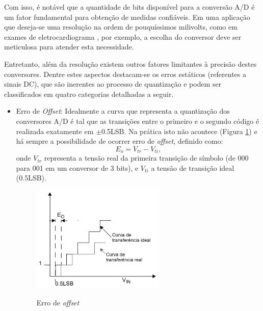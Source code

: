 \documentclass[oneside,openright,12pt]{ufsm_2015} %
\begin{document}
Com isso, é notável que a quantidade de bits disponível para a conversão A/D é um fator fundamental para obtenção de medidas confiáveis. Em uma aplicação que deseja-se uma resolução na ordem de pouquíssimos milivolts, como em exames de eletrocardiograma \cite{lopes2014processo}, por exemplo, a escolha do conversor deve ser meticulosa para atender esta necessidade.

Entretanto, além da resolução existem outros fatores limitantes à precisão destes conversores. Dentre estes aspectos destacam-se os erros estáticos (referentes a sinais DC), que são inerentes ao processo de quantização e podem ser classificados em quatro categorias detalhadas a seguir.

\begin{itemize}
    \item Erro de \textit{Offset}:
    Idealmente a curva que representa a quantização dos conversores A/D é tal que as transições entre o primeiro e o segundo código é realizada exatamente em $\pm$0.5LSB. Na prática isto não acontece (Figura \ref{fig:offset-adc}) e há sempre a possibilidade de ocorrer erro de \textit{offset}, definido como:
    \begin{equation}
        E_o = V_{tr} - V_{ti},
    \end{equation}
    onde $V_{tr}$ representa a tensão real da primeira transição de símbolo (de 000 para 001 em um conversor de 3 bits), e $V_{ti}$ a tensão de transição ideal (0.5LSB).  
    
    \begin{figure}[ht]
    \caption{\label{exepretex} Erro de \textit{offset}}
    \centering
    \includegraphics[width=0.6\textwidth]{figuras/erro_offset.png}
    \vspace{\baselineskip} %
        \label{fig:offset-adc}
    \end{figure}
    

\end{itemize}
\end{document}
